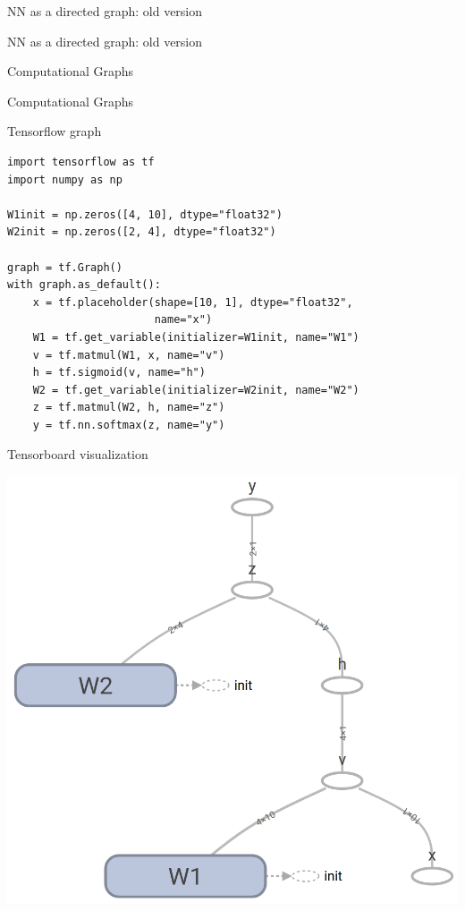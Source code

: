 \documentclass[10pt]{beamer}
\begin{document}
\begin{frame}[fragile]{NN as a directed graph: old version}

\end{frame}

\begin{frame}[fragile]{NN as a directed graph: old version}
\begin{center}

\end{center}
\end{frame}

\begin{frame}[fragile]{Computational Graphs}

\end{frame}

\begin{frame}[fragile]{Computational Graphs}

\end{frame}



\begin{frame}[fragile]{Tensorflow graph}
\begin{verbatim}
import tensorflow as tf
import numpy as np

W1init = np.zeros([4, 10], dtype="float32")
W2init = np.zeros([2, 4], dtype="float32")

graph = tf.Graph() 
with graph.as_default():
    x = tf.placeholder(shape=[10, 1], dtype="float32",
                       name="x") 
    W1 = tf.get_variable(initializer=W1init, name="W1")
    v = tf.matmul(W1, x, name="v")
    h = tf.sigmoid(v, name="h")
    W2 = tf.get_variable(initializer=W2init, name="W2")
    z = tf.matmul(W2, h, name="z")
    y = tf.nn.softmax(z, name="y")
\end{verbatim}
\end{frame}

\begin{frame}[fragile]{Tensorboard visualization}
\begin{center}
\includegraphics[scale=0.255]{images/basic_tf_graph.png}
\end{center}
\end{frame}
\end{document}

